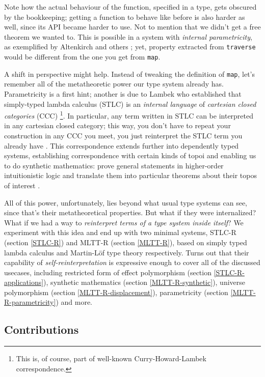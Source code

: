 \documentclass[acmsmall, review, screen, authorversion]{acmart}
\begin{document}
Note how the actual behaviour of the function, specified in a type,
gets obscured by the bookkeeping; getting a function to behave like
before is also harder as well, since its API became harder to use.
Not to mention that we didn't get a free theorem we wanted to. This
is possible in a system with \textit{internal parametricity}, as
exemplified by Altenkirch and others
\cite{Altenkirch:Parametricity2024}; yet, property extracted from
\texttt{traverse} would be different from the one you get from
\texttt{map}.

A shift in perspective might help. Instead of tweaking the definition
of \texttt{map}, let's remember all of the metatheoretic power our
type system already has. Parametricity is a first hint; another is
due to Lambek \cite{Lambek1980} who established that simply-typed
lambda calculus (STLC) is an \textit{internal language} of
\textit{cartesian closed categories} (CCC) \footnote{This is, of
course, part of well-known Curry-Howard-Lambek correspondence.}. In
particular, any term written in STLC can be interpreted in any
cartesian closed category; this way, you don't have to repeat your
construction in any CCC you meet, you just reinterpret the STLC term
you already have \cite{Elliott:Compcat2017}. This correspondence
extends further into dependently typed systems, establishing
correspondence with certain kinds of topoi and enabling us to do
synthetic mathematics: prove general statements in higher-order
intuitionistic logic and translate them into particular theorems
about their topos of interest \cite{Nawrocki:Lean2026}.

All of this power, unfortunately, lies beyond what usual type systems
can see, since that's their metatheoretical properties. But what if
they were internalized? What if we had a way to \textit{reinterpret
terms of a type system inside itself}? We experiment with this idea
and end up with two minimal systems, STLC-R (section \ref{STLC-R})
and MLTT-R (section \ref{MLTT-R}), based on simply typed lambda
calculus and Martin-L\"of type theory respectively. Turns out that
their capability of \textit{self-reinterpretation} is expressive
enough to cover all of the discussed usecases, including restricted
form of effect polymorphism (section \ref{STLC-R-applications}),
synthetic mathematics (section \ref{MLTT-R-synthetic}), universe
polymorphism (section \ref{MLTT-R-displacement}), parametricity
(section \ref{MLTT-R-parametricity}) and more.

\subsection{Contributions}
\end{document}
